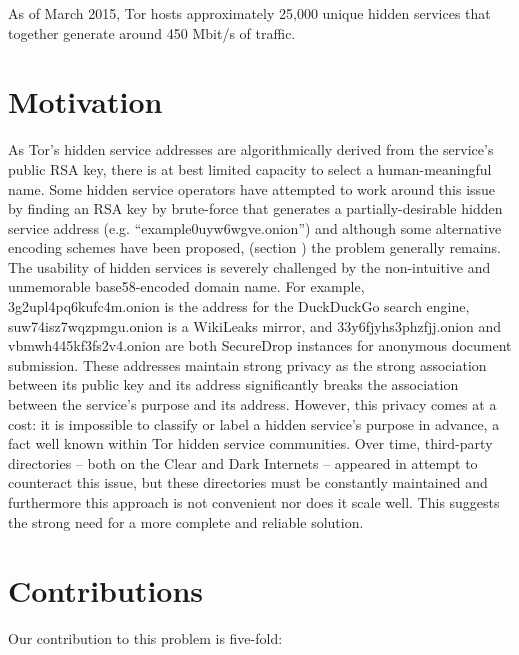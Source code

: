 As of March 2015, Tor hosts approximately 25,000 unique hidden services that together generate around 450 Mbit/s of traffic.\cite{TorMetrics}


\section{Motivation}
\label{sec:Motivation}

As Tor's hidden service addresses are algorithmically derived from the service's public RSA key, there is at best limited capacity to select a human-meaningful name. Some hidden service operators have attempted to work around this issue by finding an RSA key by brute-force that generates a partially-desirable hidden service address (e.g. ``example0uyw6wgve.onion'') and although some alternative encoding schemes have been proposed, (section \label{sec:EncodingSchemes}) the problem generally remains. The usability of hidden services is severely challenged by the non-intuitive and unmemorable base58-encoded domain name. For example, 3g2upl4pq6kufc4m.onion is the address for the DuckDuckGo search engine, \\ suw74isz7wqzpmgu.onion is a WikiLeaks mirror, and 33y6fjyhs3phzfjj.onion and \\ vbmwh445kf3fs2v4.onion are both SecureDrop instances for anonymous document submission. These addresses maintain strong privacy as the strong association between its public key and its address significantly breaks the association between the service's purpose and its address. However, this privacy comes at a cost: it is impossible to classify or label a hidden service's purpose in advance, a fact well known within Tor hidden service communities. Over time, third-party directories -- both on the Clear and Dark Internets -- appeared in attempt to counteract this issue, but these directories must be constantly maintained and furthermore this approach is not convenient nor does it scale well. This suggests the strong need for a more complete and reliable solution.

\section{Contributions}

Our contribution to this problem is five-fold:

